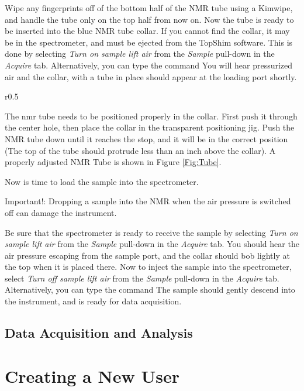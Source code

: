 \documentclass[12pt, openany, letterpaper]{memoir}
\begin{document}
Wipe any fingerprints off of the bottom half of the NMR tube using a Kimwipe, and handle the tube only on the top half from now on. Now the tube is ready to be inserted into the blue NMR tube collar. If you cannot find the collar, it may be in the spectrometer, and must be ejected from the TopShim software. This is done by selecting \emph{Turn on sample lift air} from the \emph{Sample} pull-down in the \emph{Acquire} tab. Alternatively, you can type the command
You will hear pressurized air and the collar, with a tube in place should appear at the loading port shortly. 

\begin{wrapfigure}{r}{0.5\linewidth}
\begin{center}
\caption{A Properly Adjusted NMR Tube}
\label{Fig:Tube}
\end{center}
\end{wrapfigure}

The nmr tube needs to be positioned properly in the collar. First push it through the center hole, then place the collar in the transparent positioning jig. Push the NMR tube down until it reaches the stop, and it will be in the correct position (The top of the tube should protrude less than an inch above the collar). A properly adjusted NMR Tube is shown in Figure \ref{Fig:Tube}.

Now is time to load the sample into the spectrometer. 
\begin{mdframed}{\large Important!:} Dropping a sample into the NMR when the air pressure is switched off can damage the instrument. \end{mdframed}
Be sure that the spectrometer is ready to receive the sample by selecting \emph{Turn on sample lift air} from the \emph{Sample} pull-down in the \emph{Acquire} tab. You should hear the air pressure escaping from the sample port, and the collar should bob lightly at the top when it is placed there. Now to inject the sample into the spectrometer, select \emph{Turn off sample lift air} from the \emph{Sample} pull-down in the \emph{Acquire} tab. Alternatively, you can type the command
The sample should gently descend into the instrument, and is ready for data acquisition.
\section{Data Acquisition and Analysis}

\chapter{Creating a New User}
\label{CH:New}
\end{document}
